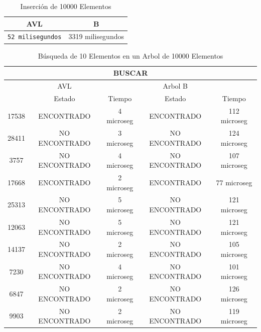 \documentclass[acmsmall]{acmart}
\begin{document}
\begin{table}[htbp]
\begin{center}
  \caption{Inserción de 10000 Elementos}
  \begin{tabular}{cc}
    \toprule
    AVL & B\\
    \midrule
    \texttt{52 milisegundos} & 3319 milisegundos \\
    \bottomrule
  \end{tabular}
  \end{center}
\end{table}
\clearpage
\begin{table}[htbp]
\begin{center}
  \caption{Búsqueda de 10 Elementos en un Arbol de 10000 Elementos}
  \begin{tabular}{ccccc}
    \toprule
    \multicolumn{5}{c}{BUSCAR}\\
    \midrule
     \, & AVL &\, & Arbol B & \,\\
     \, &Estado&Tiempo&Estado&Tiempo \\
     
      17538 &ENCONTRADO&4 microseg&ENCONTRADO&112 microseg \\
      28411 &NO ENCONTRADO&3 microseg&NO ENCONTRADO&124 microseg \\
      3757 &NO ENCONTRADO&4 microseg&NO ENCONTRADO&107 microseg \\
      17668 &ENCONTRADO&2 microseg&ENCONTRADO&77 microseg \\
      25313 &NO ENCONTRADO&5 microseg&NO ENCONTRADO&121 microseg \\
      12063 &NO ENCONTRADO&5 microseg&NO ENCONTRADO&121 microseg \\
      14137 &NO ENCONTRADO&2 microseg&NO ENCONTRADO&105 microseg \\
      7230 &NO ENCONTRADO&4 microseg&NO ENCONTRADO&101 microseg \\
       6847 &NO ENCONTRADO&2 microseg&NO ENCONTRADO&126 microseg \\
      9903 &NO ENCONTRADO&2 microseg&NO ENCONTRADO&119 microseg \\

    \bottomrule
  \end{tabular}
  \end{center}
\end{table}
\end{document}
